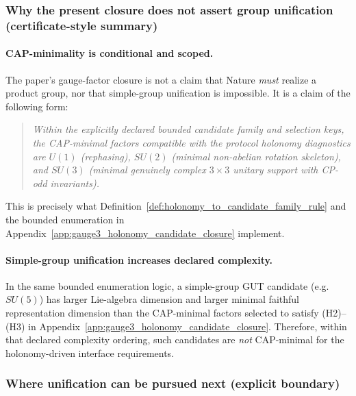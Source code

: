 \subsubsection{Why the present closure does not assert group unification (certificate-style summary)}
\paragraph{CAP-minimality is conditional and scoped.}
\AuditTag The paper's gauge-factor closure is not a claim that Nature \emph{must} realize a product group, nor that simple-group unification is impossible.
It is a claim of the following form:
\begin{quote}
\emph{Within the explicitly declared bounded candidate family and selection keys, the CAP-minimal factors compatible with the protocol holonomy diagnostics are $U(1)$ (rephasing), $SU(2)$ (minimal non-abelian rotation skeleton), and $SU(3)$ (minimal genuinely complex $3\times 3$ unitary support with CP-odd invariants).}
\end{quote}
This is precisely what Definition~\ref{def:holonomy_to_candidate_family_rule} and the bounded enumeration in Appendix~\ref{app:gauge3_holonomy_candidate_closure} implement.

\paragraph{Simple-group unification increases declared complexity.}
\AuditTag In the same bounded enumeration logic, a simple-group GUT candidate (e.g.\ $SU(5)$) has larger Lie-algebra dimension and larger minimal faithful representation dimension than the CAP-minimal factors selected to satisfy (H2)--(H3) in Appendix~\ref{app:gauge3_holonomy_candidate_closure}.
Therefore, within that declared complexity ordering, such candidates are \emph{not} CAP-minimal for the holonomy-driven interface requirements.

\subsubsection{Where unification can be pursued next (explicit boundary)}
